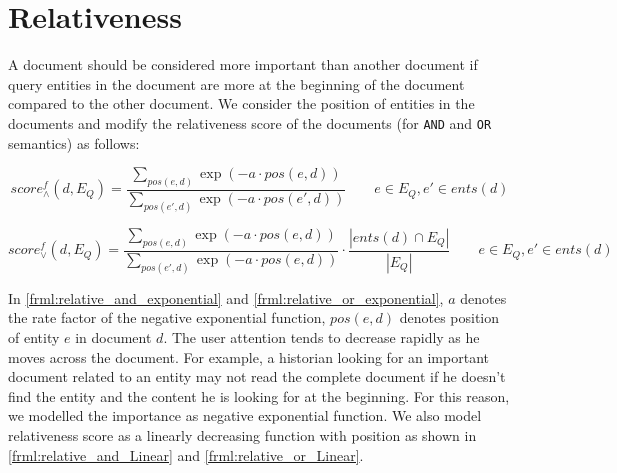 \documentclass[10pt,a4paper]{article} %
\begin{document}
    \title{\rmfamily{}}
    \author{}
    \date{\vspace{-5ex}}
    
    \maketitle
    
    \section{Relativeness}
    
    A document should be considered more important than another document if query entities in the document
    are more at the beginning of the document compared to the other document.
    We consider the position of entities in the documents and modify the relativeness 
    score of the documents (for {\tt AND} and {\tt OR} semantics) as follows: 
    
    \begin{equation}
    \label{frml:relative_and_exponential}
    score^{f}_{\wedge}(d, E_Q) = \frac{ \sum_{pos(e,d)}{\exp(-a \cdot pos(e,d))}}{\sum_{pos(e',d)}{\exp(-a \cdot pos(e',d))}} \qquad e\in E_Q, e'\in ents(d)
    \end{equation}

    \begin{equation}
    \label{frml:relative_or_exponential}
    score^{f}_{\vee}(d, E_Q) = \frac{ \sum_{pos(e,d)}{\exp(-a \cdot pos(e,d))}}{ \sum_{pos(e',d)}{\exp(-a \cdot pos(e,d))}} \cdot \frac{|ents(d) \cap E_Q|}{|E_Q|} \qquad e\in E_Q, e'\in ents(d)
    \end{equation}

    \noindent In \ref{frml:relative_and_exponential} and \ref{frml:relative_or_exponential}, $a$ denotes the rate factor of the negative 
    exponential function, $pos(e,d)$ denotes position of entity $e$ in document $d$. 
    The user attention tends to decrease rapidly as he moves across the document. 
    For example, a historian looking for an important document related to an entity may not read the complete document if he doesn't find the entity and the content he is looking for at the beginning. 
    For this reason, we modelled the importance as negative exponential 
    function.
    We also model relativeness score as a linearly decreasing function with position as shown in \ref{frml:relative_and_Linear} and \ref{frml:relative_or_Linear}.  
    
\end{document}
